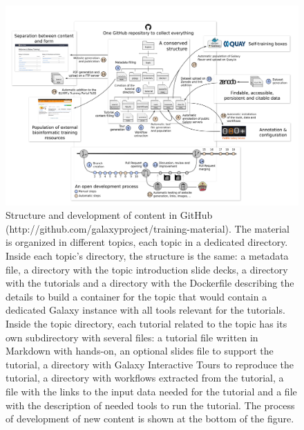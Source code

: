 \begin{figure}
    \centering
    \includegraphics[width=\textwidth]{chapters/images/training/training-figure-development.png}
    \caption{Structure and development of content in GitHub (http://github.com/galaxyproject/training-material). The material is organized in different topics, each topic in a dedicated directory. Inside each topic’s directory, the structure is the same: a metadata file, a directory with the topic introduction slide decks, a directory with the tutorials and a directory with the Dockerfile describing the details to build a container for the topic that would contain a dedicated Galaxy instance with all tools relevant for the tutorials. Inside the topic directory, each tutorial related to the topic has its own subdirectory with several files: a tutorial file written in Markdown with hands-on, an optional slides file to support the tutorial, a directory with Galaxy Interactive Tours to reproduce the tutorial, a directory with workflows extracted from the tutorial, a file with the links to the input data needed for the tutorial and a file with the description of needed tools to run the tutorial. The process of development of new content is shown at the bottom of the figure.}
    \label{fig:development}
\end{figure}


